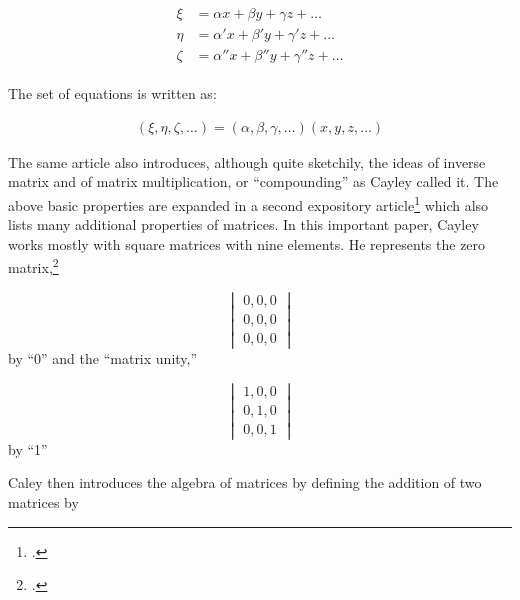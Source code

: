 {{{\begin{gather}
\begin{aligned}
\xi  &= \alpha x + \beta y + \gamma z + \dots\\
\eta  &= \alpha' x + \beta' y + \gamma' z + \dots\\
\zeta &= \alpha'' x + \beta'' y + \gamma'' z + \dots
\end{aligned}
\end{gather}

The set of equations is written as:

\begin{gather}
(\xi, \eta, \zeta,\dots ) = (\alpha,\beta,\gamma,\dots)(x,y,z,\dots)
\end{gather}

The same article also introduces, although quite sketchily, the ideas of inverse matrix and of matrix multiplication, or \enquote{compounding} as Cayley called it. The above basic properties are expanded in a second expository article\footcite{fieldman1962} which
also lists many additional properties of matrices. In this important paper, Cayley works mostly with square matrices with
nine elements. He represents the zero matrix,\footcite[This is an interesting development]{fieldman1962}

\[
\begin{vmatrix}
0,0,0\\
0,0,0\\
0,0,0
\end{vmatrix}
\]
by \enquote{0} and the \enquote{matrix unity,}

\[
\begin{vmatrix}
1,0,0\\
0,1,0\\
0,0,1
\end{vmatrix}
\]
by \enquote{1}

Caley then introduces the algebra of matrices by defining the addition of two matrices by

}}}
